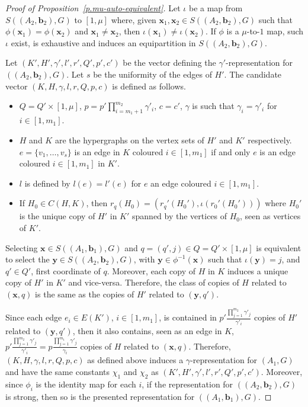 \documentclass[10pt]{article}
\begin{document}
\begin{proof}[Proof of Proposition~\ref{p.mu-auto-equivalent}]
	
			Let $\iota$ be a map from $S((A_2,\mathbf{b}_2),G)$ to $[1,\mu]$ where, given $\mathbf{x}_1, \mathbf{x}_2\in S((A_2,\mathbf{b}_2),G)$ such that  $\phi(\mathbf{x}_1)=\phi(\mathbf{x}_2)$ and $\mathbf{x}_1\neq \mathbf{x}_2$, then $\iota(\mathbf{x}_1)\neq \iota(\mathbf{x}_2)$. If $\phi$ is a $\mu$-to-$1$ map, such $\iota$ exist, is exhaustive and induces an equipartition in $S((A_2,\mathbf{b}_2),G)$.
	
	Let $(K',H',\gamma',l',r',Q',p',c')$ be the vector defining the $\gamma'$-representation for $((A_2,\mathbf{b}_2),G)$. Let $s$ be the uniformity of the edges of $H'$. The candidate vector $(K,H,\gamma,l,r,Q,p,c)$ 
	is defined as follows.
	\begin{itemize}
		\item $Q=Q'\times [1,\mu]$, $p=p'\prod_{i=m_1+1}^{m_2} \gamma'_i$, $c=c'$, $\gamma$ is such that $\gamma_i=\gamma'_i $ for $i\in[1,m_1]$.
		\item $H$ and $K$ are the hypergraphs on the vertex sets of $H'$ and $K'$ respectively. $e=\{v_1,\ldots,v_s\}$ is an edge in $K$ coloured $i\in[1,m_1]$ if and only $e$ is an edge coloured $i\in[1,m_1]$ in $K'$. 
		\item $l$ is defined by $l(e)=l'(e)$ for $e$ an edge coloured $i\in[1,m_1]$.
		\item 
If $H_0\in C(H,K)$, then
$r_q(H_0)=(r_q'(H_0'),\iota(r_0'(H_0')))$ where $H_0'$ is the unique copy of $H'$ in $K'$ spanned by the vertices of $H_0$, seen as vertices of $K'$.
	\end{itemize}
	
	
	Selecting $\mathbf{x}\in S((A_1,\mathbf{b}_1),G)$ and $q=(q',j)\in Q=Q'\times[1,\mu]$ is equivalent to select the $\mathbf{y}\in S((A_2,\mathbf{b}_2),G)$, with $\mathbf{y}\in \phi^{-1}(\mathbf{x})$ 
	 such that $\iota(\mathbf{y})=j$, 
and $q'\in Q'$, first coordinate of $q$. Moreover, each copy of $H$ in $K$ induces a unique copy of $H'$ in $K'$ and vice-versa. Therefore, the class of copies of $H$ related to $(\mathbf{x},q)$ is the same as the copies of $H'$ related to $(\mathbf{y},q')$.
	
	Since each edge $e_i\in E(K')$, $i\in [1,m_1]$, is contained in $p'\frac{\prod_{j=1}^{m_2}\gamma'_j}{\gamma'_i}$ copies of $H'$ related to $(\mathbf{y},q')$, then it also contains, seen as an edge in $K$, $p'\frac{\prod_{j=1}^{m_2}\gamma'_j}{\gamma'_i}=p\frac{\prod_{j=1}^{m_1}\gamma'_j}{\gamma_i}$ copies of $H$ related to $(\mathbf{x},q)$. Therefore, $(K,H,\gamma,l,r,Q,p,c)$ as defined above induces a $\gamma$-representation for $(A_1,G)$ and have the same constants $\chi_1$ and $\chi_2$ as $(K',H',\gamma',l',r',Q',p',c')$. Moreover, since $\phi_i$ is the identity map for each $i$, if the representation for $((A_2,\mathbf{b}_2),G)$ is strong, then so is the presented representation for $((A_1,\mathbf{b}_1),G)$. 
\end{proof}
\end{document}
